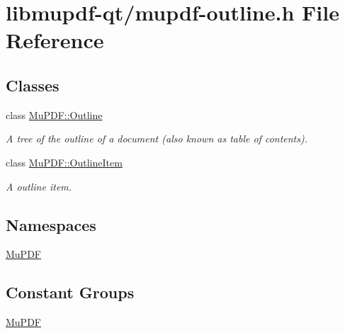 \hypertarget{mupdf-outline_8h}{\section{libmupdf-\/qt/mupdf-\/outline.h File Reference}
\label{mupdf-outline_8h}
}
\subsection*{Classes}
\begin{DoxyCompactItemize}
\item 
class \hyperlink{class_mu_p_d_f_1_1_outline}{Mu\-P\-D\-F\-::\-Outline}
\begin{DoxyCompactList}\small\item\em A tree of the outline of a document (also known as table of contents). \end{DoxyCompactList}\item 
class \hyperlink{class_mu_p_d_f_1_1_outline_item}{Mu\-P\-D\-F\-::\-Outline\-Item}
\begin{DoxyCompactList}\small\item\em A outline item. \end{DoxyCompactList}\end{DoxyCompactItemize}
\subsection*{Namespaces}
\begin{DoxyCompactItemize}
\item 
\hyperlink{namespace_mu_p_d_f}{Mu\-P\-D\-F}
\end{DoxyCompactItemize}
\subsection*{Constant Groups}
\begin{DoxyCompactItemize}
\item 
\hyperlink{namespace_mu_p_d_f}{Mu\-P\-D\-F}
\end{DoxyCompactItemize}

